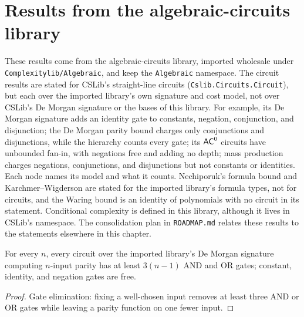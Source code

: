 \section{Results from the algebraic-circuits library}
\label{sec:lowerbounds-algebraic}

These results come from the algebraic-circuits library, imported wholesale
under \texttt{Complexitylib/Algebraic}, and keep the \texttt{Algebraic}
namespace. The circuit results are stated for CSLib's straight-line circuits
(\texttt{Cslib.Circuits.Circuit}), but each over the imported library's own
signature and cost model, not over CSLib's De Morgan signature or the bases of
this library. For example, its De Morgan signature adds an identity gate to
constants, negation, conjunction, and disjunction; the De Morgan parity bound
charges only conjunctions and disjunctions, while the hierarchy counts every
gate; its $\mathsf{AC}^0$ circuits have unbounded fan-in, with negations free and
adding no depth; mass production charges negations, conjunctions, and
disjunctions but not constants or identities. Each node names its model and
what it counts. Nechiporuk's formula bound and Karchmer--Wigderson are stated for the
imported library's formula types, not for circuits, and the Waring bound is an
identity of polynomials with no circuit in its statement. Conditional complexity is defined in this library,
although it lives in CSLib's namespace. The consolidation plan in
\texttt{ROADMAP.md} relates these results to the statements elsewhere in this
chapter.

\begin{theorem}
  \label{thm:lowerbounds-algebraic-xor}
  \leanok
  For every $n$, every circuit over the imported library's De Morgan signature
  computing $n$-input parity has at least $3(n - 1)$ AND and OR gates; constant,
  identity, and negation gates are free.
\end{theorem}
\begin{proof}
  \leanok
  Gate elimination: fixing a well-chosen input removes at least three AND or
  OR gates while leaving a parity function on one fewer input.
\end{proof}

